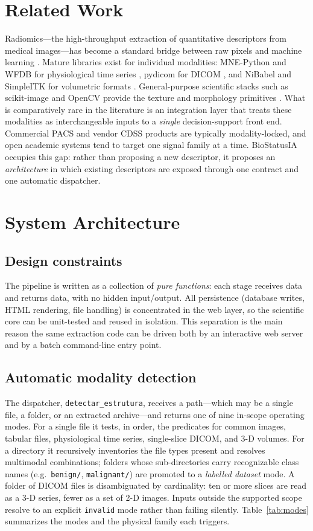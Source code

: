 \documentclass[10pt,twocolumn]{article}
\begin{document}
\section{Related Work}
Radiomics---the high-throughput extraction of quantitative descriptors from
medical images---has become a standard bridge between raw pixels and machine
learning \cite{gillies2016radiomics,haralick1973}. Mature libraries exist for
individual modalities: MNE-Python and WFDB for physiological time series
\cite{gramfort2013}, pydicom for DICOM \cite{mason2011pydicom}, and NiBabel and
SimpleITK for volumetric formats \cite{brett2020nibabel}. General-purpose
scientific stacks such as scikit-image and OpenCV provide the texture and
morphology primitives \cite{vanderwalt2014skimage,pedregosa2011sklearn}.
What is comparatively rare in the literature is an integration layer that treats
these modalities as interchangeable inputs to a \emph{single} decision-support
front end. Commercial PACS and vendor CDSS products are typically
modality-locked, and open academic systems tend to target one signal family at
a time. BioStatusIA occupies this gap: rather than proposing a new descriptor,
it proposes an \emph{architecture} in which existing descriptors are exposed
through one contract and one automatic dispatcher.

\section{System Architecture}
\subsection{Design constraints}
The pipeline is written as a collection of \emph{pure functions}: each stage
receives data and returns data, with no hidden input/output. All persistence
(database writes, HTML rendering, file handling) is concentrated in the web
layer, so the scientific core can be unit-tested and reused in isolation. This
separation is the main reason the same extraction code can be driven both by an
interactive web server and by a batch command-line entry point.

\subsection{Automatic modality detection}
The dispatcher, \texttt{detectar\_estrutura}, receives a path---which may be a
single file, a folder, or an extracted archive---and returns one of nine
in-scope operating modes. For a single file it tests, in order, the predicates
for common images, tabular files, physiological time series, single-slice DICOM,
and 3-D volumes. For a directory it recursively inventories the file types
present and resolves multimodal combinations; folders whose sub-directories
carry recognizable class names (e.g.\ \texttt{benign/}, \texttt{malignant/}) are
promoted to a \emph{labelled dataset} mode. A folder of DICOM files is
disambiguated by cardinality: ten or more slices are read as a 3-D series,
fewer as a set of 2-D images. Inputs outside the supported scope resolve to an
explicit \texttt{invalid} mode rather than failing silently. Table~\ref{tab:modes}
summarizes the modes and the physical family each triggers.
\end{document}
